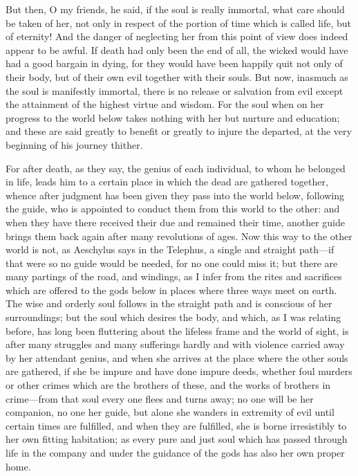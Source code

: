 But then, O my friends, he said, if the soul is really immortal, what care
should be taken of her, not only in respect of the portion of time which
is called life, but of eternity! And the danger of neglecting her from
this point of view does indeed appear to be awful. If death had only been
the end of all, the wicked would have had a good bargain in dying, for
they would have been happily quit not only of their body, but of their own
evil together with their souls. But now, inasmuch as the soul is
manifestly immortal, there is no release or salvation from evil except the
attainment of the highest virtue and wisdom. For the soul when on her
progress to the world below takes nothing with her but nurture and
education; and these are said greatly to benefit or greatly to injure the
departed, at the very beginning of his journey thither.

For after death, as they say, the genius of each individual, to whom he
belonged in life, leads him to a certain place in which the dead are
gathered together, whence after judgment has been given they pass into the
world below, following the guide, who is appointed to conduct them from
this world to the other: and when they have there received their due and
remained their time, another guide brings them back again after many
revolutions of ages. Now this way to the other world is not, as Aeschylus
says in the Telephus, a single and straight path—if that were so no
guide would be needed, for no one could miss it; but there are many
partings of the road, and windings, as I infer from the rites and
sacrifices which are offered to the gods below in places where three ways
meet on earth. The wise and orderly soul follows in the straight path and
is conscious of her surroundings; but the soul which desires the body, and
which, as I was relating before, has long been fluttering about the
lifeless frame and the world of sight, is after many struggles and many
sufferings hardly and with violence carried away by her attendant genius,
and when she arrives at the place where the other souls are gathered, if
she be impure and have done impure deeds, whether foul murders or other
crimes which are the brothers of these, and the works of brothers in crime—from
that soul every one flees and turns away; no one will be her companion, no
one her guide, but alone she wanders in extremity of evil until certain
times are fulfilled, and when they are fulfilled, she is borne
irresistibly to her own fitting habitation; as every pure and just soul
which has passed through life in the company and under the guidance of the
gods has also her own proper home.


